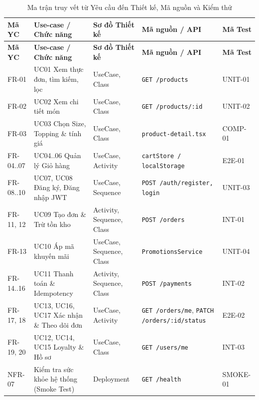 \small
\renewcommand{\arraystretch}{1.22}
\begin{longtable}{|p{}|p{}|p{}|p{}|p{}|}
\caption{Ma trận truy vết từ Yêu cầu đến Thiết kế, Mã nguồn và Kiểm thử} \\
\hline
\textbf{Mã YC} & \textbf{Use-case / Chức năng} & \textbf{Sơ đồ Thiết kế} & \textbf{Mã nguồn / API} & \textbf{Mã Test} \\
\hline
\endfirsthead
\hline
\textbf{Mã YC} & \textbf{Use-case / Chức năng} & \textbf{Sơ đồ Thiết kế} & \textbf{Mã nguồn / API} & \textbf{Mã Test} \\
\hline
\endhead
\hline
\endfoot
FR-01 & UC01 Xem thực đơn, tìm kiếm, lọc & UseCase, Class & \texttt{GET /products} & UNIT-01 \\
\hline
FR-02 & UC02 Xem chi tiết món & UseCase, Class & \texttt{GET /products/:id} & UNIT-02 \\
\hline
FR-03 & UC03 Chọn Size, Topping \& tính giá & UseCase, Class & \texttt{product-detail.tsx} & COMP-01 \\
\hline
FR-04..07 & UC04..06 Quản lý Giỏ hàng & UseCase, Activity & \texttt{cartStore / localStorage} & E2E-01 \\
\hline
FR-08..10 & UC07, UC08 Đăng ký, Đăng nhập JWT & UseCase, Sequence & \texttt{POST /auth/register, login} & UNIT-03 \\
\hline
FR-11, 12 & UC09 Tạo đơn \& Trừ tồn kho & Activity, Sequence, Class & \texttt{POST /orders} & INT-01 \\
\hline
FR-13 & UC10 Áp mã khuyến mãi & UseCase, Sequence, Class & \texttt{PromotionsService} & UNIT-04 \\
\hline
FR-14..16 & UC11 Thanh toán \& Idempotency & Activity, Sequence, Class & \texttt{POST /payments} & INT-02 \\
\hline
FR-17, 18 & UC13, UC16, UC17 Xác nhận \& Theo dõi đơn & UseCase, Activity & \texttt{GET /orders/me}, \texttt{PATCH /orders/:id/status} & E2E-02 \\
\hline
FR-19, 20 & UC12, UC14, UC15 Loyalty \& Hồ sơ & UseCase, Class & \texttt{GET /users/me} & INT-03 \\
\hline
NFR-07 & Kiểm tra sức khỏe hệ thống (Smoke Test) & Deployment & \texttt{GET /health} & SMOKE-01 \\
\hline
\end{longtable}
\normalsize

